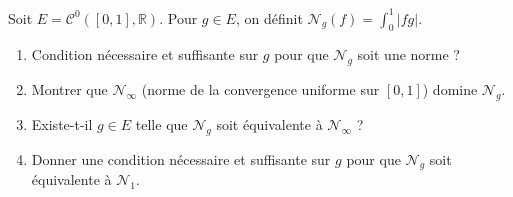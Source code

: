 \documentclass[french,a4paper]{article}
\newcommand{\R}{\mathbb{R}}
\theoremstyle{plain}
\theoremstyle{definition}
\theoremstyle{remark}
\begin{document}
\begin{ex}{}
	Soit $E=\mathcal{C}^0([0,1],\R)$. Pour $g\in E$, on définit $\mathcal{N}_g(f)=\displaystyle\int_{0}^{1}\lvert fg\rvert$.
	\begin{enumerate}
		\item Condition nécessaire et suffisante sur $g$ pour que $\mathcal{N}_g$ soit une norme ?
		\item Montrer que $\mathcal{N}_\infty$ (norme de la convergence uniforme sur $[0,1]$) domine $\mathcal{N}_g$.
		\item Existe-t-il $g\in E$ telle que $\mathcal{N}_g$ soit équivalente à $\mathcal{N}_\infty$ ?
		\item Donner une condition nécessaire et suffisante sur $g$ pour que $\mathcal{N}_g$ soit équivalente à $\mathcal{N}_1$.
	\end{enumerate}
\end{ex}
\end{document}
